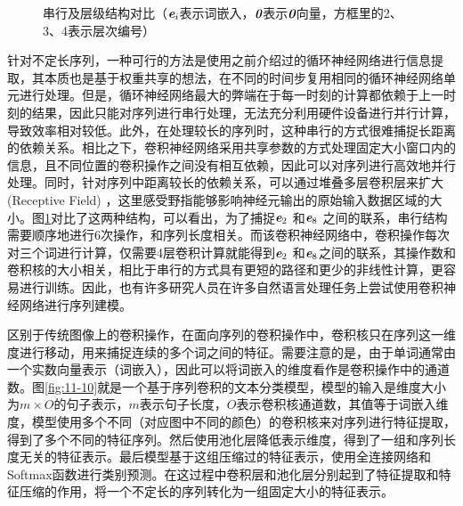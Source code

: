 \begin{figure}[htp]
\centering
%
\caption{串行及层级结构对比（$\textbf{\em e}_i$表示词嵌入，$\textbf{\em 0}$表示$\textbf{\em 0}$向量，方框里的2、3、4表示层次编号）}
\label{fig:11-9}
\end{figure}
\vspace{-1em}
\parinterval 针对不定长序列，一种可行的方法是使用之前介绍过的循环神经网络进行信息提取，其本质也是基于权重共享的想法，在不同的时间步复用相同的循环神经网络单元进行处理。但是，循环神经网络最大的弊端在于每一时刻的计算都依赖于上一时刻的结果，因此只能对序列进行串行处理，无法充分利用硬件设备进行并行计算，导致效率相对较低。此外，在处理较长的序列时，这种串行的方式很难捕捉长距离的依赖关系。相比之下，卷积神经网络采用共享参数的方式处理固定大小窗口内的信息，且不同位置的卷积操作之间没有相互依赖，因此可以对序列进行高效地并行处理。同时，针对序列中距离较长的依赖关系，可以通过堆叠多层卷积层来扩大{\small{}} (Receptive Field)  ，这里感受野指能够影响神经元输出的原始输入数据区域的大小。图\ref{fig:11-9}对比了这两种结构，可以看出，为了捕捉$\textbf{\em e}_2$ 和$\textbf{\em e}_8$ 之间的联系，串行结构需要顺序地进行6次操作，和序列长度相关。而该卷积神经网络中，卷积操作每次对三个词进行计算，仅需要4层卷积计算就能得到$\textbf{\em e}_2$ 和$\textbf{\em e}_8$之间的联系，其操作数和卷积核的大小相关，相比于串行的方式具有更短的路径和更少的非线性计算，更容易进行训练。因此，也有许多研究人员在许多自然语言处理任务上尝试使用卷积神经网络进行序列建模。

\parinterval 区别于传统图像上的卷积操作，在面向序列的卷积操作中，卷积核只在序列这一维度进行移动，用来捕捉连续的多个词之间的特征。需要注意的是，由于单词通常由一个实数向量表示（词嵌入），因此可以将词嵌入的维度看作是卷积操作中的通道数。图\ref{fig:11-10}就是一个基于序列卷积的文本分类模型，模型的输入是维度大小为$m\times O $的句子表示，$m$表示句子长度，$O$表示卷积核通道数，其值等于词嵌入维度，模型使用多个不同（对应图中不同的颜色）的卷积核来对序列进行特征提取，得到了多个不同的特征序列。然后使用池化层降低表示维度，得到了一组和序列长度无关的特征表示。最后模型基于这组压缩过的特征表示，使用全连接网络和Softmax函数进行类别预测。在这过程中卷积层和池化层分别起到了特征提取和特征压缩的作用，将一个不定长的序列转化为一组固定大小的特征表示。

